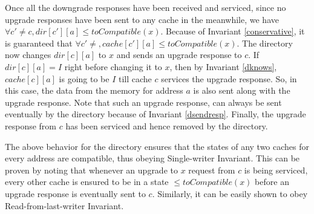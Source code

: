 Once all the downgrade responses have been received and serviced, since no
upgrade responses have been sent to any cache in the meanwhile, we have $\forall
c' \neq c, dir[c'][a] \le toCompatible(x)$. Because of Invariant
\ref{conservative}, it is guaranteed that $\forall c' \neq, cache[c'][a] \le
toCompatible(x)$. The directory now changes $dir[c][a]$ to $x$ and sends an
upgrade response  to $c$. If $dir[c][a] = I$ right before
changing it to $x$, then by Invariant \ref{dknows}, $cache[c][a]$ is going to be
$I$ till cache $c$ services the upgrade response. So, in this case, the data
from the memory for address $a$ is also sent along with the upgrade response.
Note that such an upgrade response, can always be sent eventually by the
directory because of Invariant \ref{dsendresp}. Finally, the upgrade response
from $c$ has been serviced and hence removed by the directory.

The above behavior for the directory ensures that the states of any two caches
for every address are compatible, thus obeying Single-writer Invariant. This can
be proven by noting that whenever an upgrade to $x$ request from $c$ is being
serviced, every other cache is ensured to be in a state $\le toCompatible(x)$
before an upgrade response is eventually sent to $c$. Similarly, it can be
easily shown to obey Read-from-last-writer Invariant.



